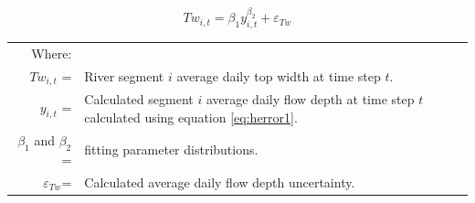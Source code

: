 \begin{equation}
	\label{eq:Tw1}
	Tw_{i,t} = \beta_1 y_{i,t} ^{\beta_2} + \varepsilon_{Tw}
\end{equation}
\begin{tabular}{r p{5in}}
	Where: & \\
	$ Tw_{i,t} $ =& River segment $ i $ average daily top width at time step $ t $.\\
	$ y_{i,t} $ =& Calculated segment $ i $ average daily flow depth at time step $ t $ calculated using equation \ref{eq:herror1}.\\
	$ \beta_1 $ and $ \beta_2 $ =& fitting parameter distributions.\\
	$ \varepsilon_{Tw} $=& Calculated average daily flow depth uncertainty.\\
\end{tabular}\\

